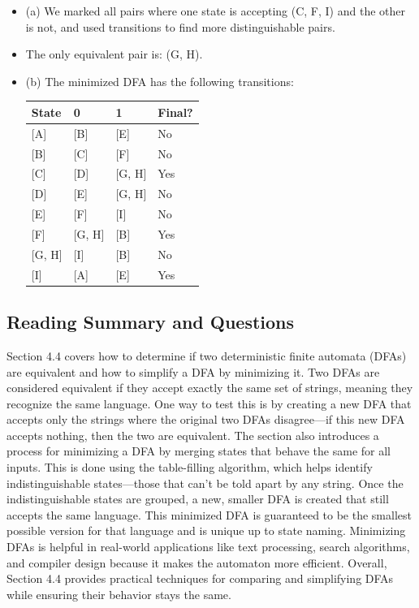 \documentclass{article}
\theoremstyle{theorem}
\theoremstyle{definition}
\theoremstyle{remark}
\begin{document}
\begin{itemize}
    \item (a) We marked all pairs where one state is accepting (C, F, I) and the other is not, and used transitions to find more distinguishable pairs.
    \item The only equivalent pair is: (G, H).
    \item (b) The minimized DFA has the following transitions:

    \begin{center}
    \begin{tabular}{|l|l|l|l|}
        \hline
        State & 0 & 1 & Final? \\
        \hline
        \textnormal{[A]} & \textnormal{[B]} & \textnormal{[E]} & No \\
        \textnormal{[B]} & \textnormal{[C]} & \textnormal{[F]} & No \\
        \textnormal{[C]} & \textnormal{[D]} & \textnormal{[G, H]} & Yes \\
        \textnormal{[D]} & \textnormal{[E]} & \textnormal{[G, H]} & No \\
        \textnormal{[E]} & \textnormal{[F]} & \textnormal{[I]} & No \\
        \textnormal{[F]} & \textnormal{[G, H]} & \textnormal{[B]} & Yes \\
        \textnormal{[G, H]} & \textnormal{[I]} & \textnormal{[B]} & No \\
        \textnormal{[I]} & \textnormal{[A]} & \textnormal{[E]} & Yes \\
        \hline
    \end{tabular}
    \end{center}
\end{itemize}


\subsection*{Reading Summary and Questions}
Section 4.4 covers how to determine if two deterministic finite automata (DFAs) are equivalent and how to simplify a DFA by minimizing it. Two DFAs are considered equivalent if they accept exactly the same set of strings, 
meaning they recognize the same language. One way to test this is by creating a new DFA that accepts only the strings where the original two DFAs disagree—if this new DFA accepts nothing, then the two are equivalent. 
The section also introduces a process for minimizing a DFA by merging states that behave the same for all inputs. This is done using the table-filling algorithm, which helps identify indistinguishable states—those that can’t 
be told apart by any string. Once the indistinguishable states are grouped, a new, smaller DFA is created that still accepts the same language. This minimized DFA is guaranteed to be the smallest possible version for that language 
and is unique up to state naming. Minimizing DFAs is helpful in real-world applications like text processing, search algorithms, and compiler design because it makes the automaton more efficient. Overall, Section 4.4 provides 
practical techniques for comparing and simplifying DFAs while ensuring their behavior stays the same.
\end{document}
